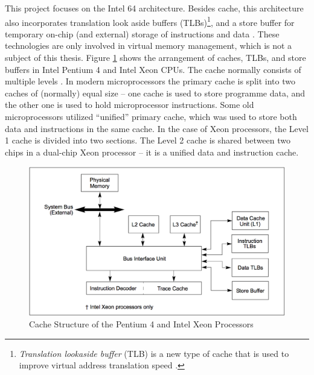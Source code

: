 This project focuses on the Intel 64 architecture. Besides cache, this architecture also incorporates translation look aside buffers (TLBs)\footnote{\textit{Translation lookaside buffer} (TLB) is a new type of cache that is used to improve virtual address translation speed \cite{Arpaci-Dusseau2014}.}, and a store buffer for temporary on-chip (and external) storage of instructions and data \cite{Intel2014}. These technologies are only involved in virtual memory management, which is not a subject of this thesis. Figure \ref{xeon_cache_figure} shows the arrangement of caches, TLBs, and store buffers in Intel Pentium 4 and Intel Xeon CPUs. The cache normally consists of multiple levels \cite{Hennessy2006}. In modern microprocessors the primary cache is split into two caches of (normally) equal size -- one cache is used to store programme data, and the other one is used to hold microprocessor instructions. Some old microprocessors utilized ``unified'' primary cache, which was used to store both data and instructions in the same cache. In the case of Xeon processors, the Level 1 cache is divided into two sections. The Level 2 cache is shared between two chips in a dual-chip Xeon processor -- it is a unified data and instruction cache.

\begin{figure}[ht!]
\centering
\includegraphics[width=145mm]{3/xeon_cache.png}
\caption{Cache Structure of the Pentium 4 and Intel Xeon Processors \cite{Intel2014}}
\label{xeon_cache_figure}
\end{figure}

